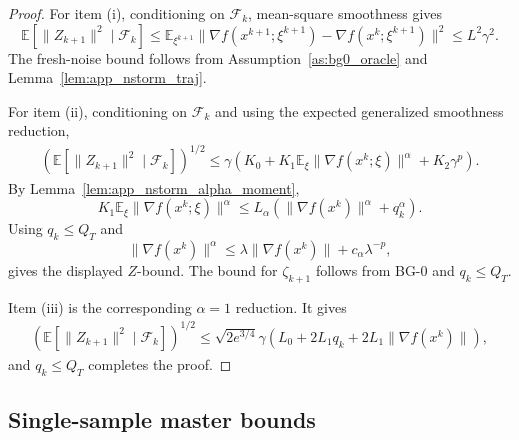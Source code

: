 \documentclass[letter,11pt]{article}
\newcommand{\E}{\mathbb{E}}
\newcommand{\cF}{\mathcal{F}}
\begin{document}
\begin{proof}
For item (i), conditioning on \(\cF_k\), mean-square smoothness gives
\[
    \E[\|Z_{k+1}\|^2\mid\cF_k]
    \le
    \E_{\xi^{k+1}}
    \|\nabla f(x^{k+1};\xi^{k+1})-\nabla f(x^k;\xi^{k+1})\|^2
    \le
    L^2\gamma^2.
\]
The fresh-noise bound follows from Assumption~\ref{as:bg0_oracle} and
Lemma~\ref{lem:app_nstorm_traj}.

For item (ii), conditioning on \(\cF_k\) and using the expected generalized
smoothness reduction,
\[
\begin{aligned}
    \left(
        \E[\|Z_{k+1}\|^2\mid\cF_k]
    \right)^{1/2}
    \le
    \gamma
    \left(
        K_0
        +
        K_1\E_\xi\|\nabla f(x^k;\xi)\|^\alpha
        +
        K_2\gamma^p
    \right).
\end{aligned}
\]
By Lemma~\ref{lem:app_nstorm_alpha_moment},
\[
    K_1\E_\xi\|\nabla f(x^k;\xi)\|^\alpha
    \le
    L_\alpha
    \left(
        \|\nabla f(x^k)\|^\alpha+q_k^\alpha
    \right).
\]
Using \(q_k\le Q_T\) and
\[
    \|\nabla f(x^k)\|^\alpha
    \le
    \lambda\|\nabla f(x^k)\|
    +
    c_\alpha\lambda^{-p},
\]
gives the displayed \(Z\)-bound. The bound for \(\zeta_{k+1}\) follows from
BG-0 and \(q_k\le Q_T\).

Item (iii) is the corresponding \(\alpha=1\) reduction. It gives
\[
\begin{aligned}
    \left(
        \E[\|Z_{k+1}\|^2\mid\cF_k]
    \right)^{1/2}
    \le
    \sqrt{2e^{3/4}}\gamma
    \left(
        L_0+2L_1q_k+2L_1\|\nabla f(x^k)\|
    \right),
\end{aligned}
\]
and \(q_k\le Q_T\) completes the proof.
\end{proof}

\subsection{Single-sample master bounds}
\label{app:nstorm_master}
\end{document}
